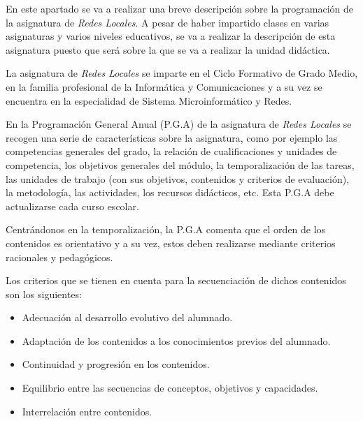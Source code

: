 \documentclass[spanish,12pt, a4paper,twoside]{paper}
\begin{document}
En este apartado se va a realizar una breve descripción sobre la programación de la asignatura de \textit{Redes Locales}. A pesar de haber impartido clases en varias asignaturas y varios niveles educativos, se va a realizar la descripción de esta asignatura puesto que será sobre la que se va a realizar la unidad didáctica. 

La asignatura de \textit{Redes Locales} se imparte en el Ciclo Formativo de Grado Medio, en la familia profesional de la Informática y Comunicaciones y a su vez se encuentra en la especialidad de Sistema Microinformático y Redes.

En la Programación General Anual (P.G.A) de la asignatura de \textit{Redes Locales} se recogen una serie de características sobre la asignatura, como por ejemplo las competencias generales del grado, la relación de cualificaciones y unidades de competencia, los objetivos generales del módulo, la temporalización de las tareas, las unidades de trabajo (con sus objetivos, contenidos y criterios de evaluación), la metodología, las actividades, los recursos didácticos, etc. Esta P.G.A debe actualizarse cada curso escolar.

Centrándonos en la temporalización, la P.G.A comenta que el orden de los contenidos es orientativo y a su vez, estos deben realizarse mediante criterios racionales y pedagógicos.

Los criterios que se tienen en cuenta para la secuenciación de dichos contenidos son los siguientes:
\begin{itemize}
\item Adecuación al desarrollo evolutivo del alumnado.
\item Adaptación de los contenidos a los conocimientos previos del alumnado.
\item Continuidad y progresión en los contenidos.
\item Equilibrio entre las secuencias de conceptos, objetivos y capacidades.
\item Interrelación entre contenidos.
\end{itemize}
\end{document}

